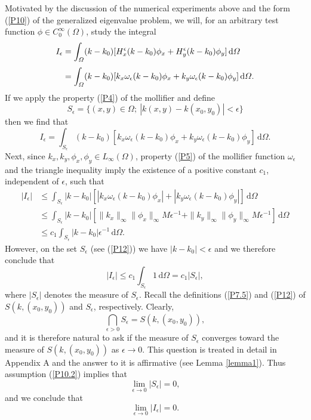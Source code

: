 \documentclass{imanum}
\begin{document}
Motivated by the discussion of the numerical experiments above
and the form (\ref{P10}) of the generalized eigenvalue problem, we
will, for an arbitrary test function $\phi \in C^\infty_0(\Omega)$,
study the integral
\begin{align}
I_\epsilon &= \int_\Omega (k-k_0) [H^\epsilon_x(k-k_0) \phi_x
+ H^\epsilon_y(k-k_0) \phi_y] \, \mathrm{d} \Omega \notag\\[3pt]
&= \int_\Omega (k-k_0) [k_x \omega_\epsilon (k-k_0) \phi_x +
k_y \omega_\epsilon (k-k_0) \phi_y] \, \mathrm{d} \Omega.
\label{P11}
\end{align}
If we apply the property (\ref{P4}) of the mollifier and define
\begin{equation}
S_{\epsilon}= \{(x,y) \in \Omega;\ |k(x,y)-k(x_0,y_0)| < \epsilon \}
\label{P12}
\end{equation}
then we find that
\begin{equation*}
I_\epsilon = \int_{S_\epsilon}
(k-k_0) [k_x \omega_\epsilon(k-k_0) \phi_x +
k_y \omega_\epsilon (k-k_0) \phi_y] \, \mathrm{d} \Omega.
\end{equation*}
Next, since $k_x, k_y, \phi_x, \phi_y \in L_{\infty}(\Omega)$,
property (\ref{P5}) of the mollifier function $\omega_\epsilon$ and
the triangle inequality imply the existence of a positive constant
$c_1$, independent of $\epsilon$, such that
\begin{align*}
|I_\epsilon| & \leq \int_{S_\epsilon}
|k-k_0| [|k_x \omega_\epsilon(k-k_0) \phi_x| +
|k_y \omega_\epsilon(k-k_0) \phi_y|] \, \mathrm{d} \Omega \\[3pt]
& \leq \int_{S_\epsilon} |k-k_0| [
\parallel\! k_x \!\parallel_\infty
\parallel\! \phi_x \!\parallel_\infty
M \epsilon^{-1} +
\parallel\! k_y \!\parallel_\infty
\parallel\! \phi_y \!\parallel_\infty
M \epsilon^{-1}] \, \mathrm{d} \Omega \\[3pt]
& \leq  c_1 \int_{S_{\epsilon}}
|k-k_0| \epsilon^{-1} \, \mathrm{d} \Omega.
\end{align*}
However, on the set $S_\epsilon$ (see (\ref{P12}))
we have $|k-k_0| < \epsilon$ and we therefore conclude that
\begin{equation}
|I_\epsilon| \leq c_1 \int_{S_\epsilon} 1 \, \mathrm{d} \Omega =
c_1 |S_\epsilon|,
\label{P13}
\end{equation}
where $|S_\epsilon|$ denotes the measure of $S_\epsilon$.
Recall the definitions (\ref{P7.5}) and (\ref{P12}) of $S(k,(x_0,y_0))$
and $S_\epsilon$, respectively. Clearly,
\begin{equation*}
\bigcap_{\epsilon > 0} S_\epsilon = S(k,(x_0,y_0)),
\end{equation*}
and it is therefore natural to ask if the measure of $S_\epsilon$
converges toward the measure of $S(k,(x_0,y_0))$ as
$\epsilon \rightarrow 0$. This question is treated in detail in
Appendix A and the answer to it is affirmative
(see Lemma \ref{lemma1}).
Thus assumption (\ref{P10.2}) implies that
\begin{equation*}
\lim_{\epsilon \rightarrow 0} |S_\epsilon| =0,
\end{equation*}
and we conclude that
\begin{equation}
\lim_{\epsilon \rightarrow 0} |I_\epsilon| =0.
\label{P14}
\end{equation}
\end{document}
